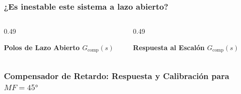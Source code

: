\begin{frame}
  \frametitle{¿Es inestable este sistema a lazo abierto?}

  \begin{columns}[c, onlytextwidth]
    \begin{column}{0.49\textwidth}
      \begin{tarjeta}[top=5pt, bottom=5pt]
        {\centering\fontsize{8.5pt}{10.5pt}\selectfont \textbf{\color{NavyDark} Polos de Lazo Abierto $G_{\text{comp}}(s)$}\par}
        \vspace{2pt}
        \centering
      \end{tarjeta}
    \end{column}

    \begin{column}{0.49\textwidth}
      \begin{tarjeta}[top=5pt, bottom=5pt]
        {\centering\fontsize{8.5pt}{10.5pt}\selectfont \textbf{\color{NavyDark} Respuesta al Escalón $G_{\text{comp}}(s)$}\par}
        \vspace{2pt}
        \centering
      \end{tarjeta}
    \end{column}
  \end{columns}
\end{frame}

\begin{frame}
  \frametitle{Compensador de Retardo: Respuesta y Calibración para $MF = \ang{45}$}

  \centering
\end{frame}

